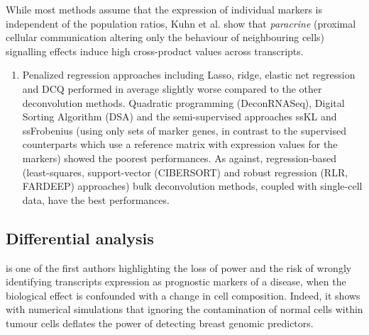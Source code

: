While most methods assume that the expression of individual markers is
independent of the population ratios, Kuhn et al.
\autocite{kuhn_etal11} show that \emph{paracrine}
(proximal cellular communication altering only the behaviour of
neighbouring cells) signalling effects induce high cross-product values
across transcripts.

\begin{enumerate}
\def\labelenumi{\arabic{enumi}.}
\setcounter{enumi}{3}

\item
  Penalized regression approaches including Lasso, ridge, elastic net
  regression and DCQ performed in average slightly worse compared to the
  other deconvolution methods. Quadratic programming (DeconRNASeq),
  Digital Sorting Algorithm (DSA) and the semi-supervised approaches
  ssKL and ssFrobenius (using only sets of marker genes, in contrast to
  the supervised counterparts which use a reference matrix with
  expression values for the markers) showed the poorest performances. As
  against, regression-based (least-squares, support-vector (CIBERSORT)
  and robust regression (RLR, FARDEEP) approaches) bulk deconvolution
  methods, coupled with single-cell data, have the best performances.
\end{enumerate}




\label{applications-of-numerical-deconvolution-methods}


\subsection{Differential analysis}
\label{differential-analysis}

\autocite{elloumi_etal11} is one of
the first authors highlighting the loss of power and the risk of wrongly
identifying transcripts expression as prognostic markers of a disease,
when the biological effect is confounded with a change in cell
composition. Indeed, it shows with numerical simulations that ignoring
the contamination of normal cells within tumour cells deflates the power
of detecting breast genomic predictors.

